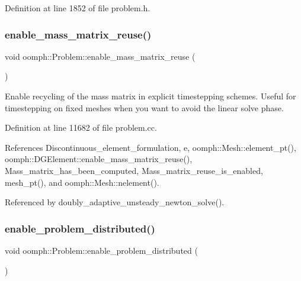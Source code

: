 Definition at line 1852 of file problem.\+h.

\mbox{\label{classoomph_1_1Problem_a6a9e63d6e585eabe4e3e551f01f658ae}} 
\subsubsection{\texorpdfstring{enable\+\_\+mass\+\_\+matrix\+\_\+reuse()}{enable\_mass\_matrix\_reuse()}}
{\footnotesize\ttfamily void oomph\+::\+Problem\+::enable\+\_\+mass\+\_\+matrix\+\_\+reuse (\begin{DoxyParamCaption}{ }\end{DoxyParamCaption})}



Enable recycling of the mass matrix in explicit timestepping schemes. Useful for timestepping on fixed meshes when you want to avoid the linear solve phase. 



Definition at line 11682 of file problem.\+cc.



References Discontinuous\+\_\+element\+\_\+formulation, e, oomph\+::\+Mesh\+::element\+\_\+pt(), oomph\+::\+D\+G\+Element\+::enable\+\_\+mass\+\_\+matrix\+\_\+reuse(), Mass\+\_\+matrix\+\_\+has\+\_\+been\+\_\+computed, Mass\+\_\+matrix\+\_\+reuse\+\_\+is\+\_\+enabled, mesh\+\_\+pt(), and oomph\+::\+Mesh\+::nelement().



Referenced by doubly\+\_\+adaptive\+\_\+unsteady\+\_\+newton\+\_\+solve().

\mbox{\label{classoomph_1_1Problem_a3fe4edae6a97460405e7f667d7d4f406}} 
\subsubsection{\texorpdfstring{enable\+\_\+problem\+\_\+distributed()}{enable\_problem\_distributed()}}
{\footnotesize\ttfamily void oomph\+::\+Problem\+::enable\+\_\+problem\+\_\+distributed (\begin{DoxyParamCaption}{ }\end{DoxyParamCaption})\hspace{0.3cm}{\ttfamily [inline]}}



